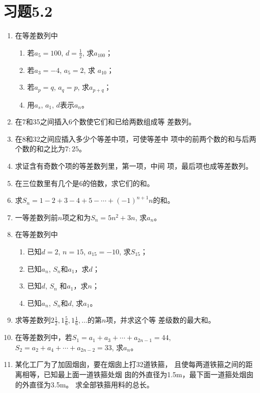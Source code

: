 \section*{习题5.2}
\begin{enumerate}
    \item 在等差数列中
\begin{multicols}{2}
\begin{enumerate}
    \item 若$a_5=100$, $d=\frac{1}{2}$,
    求$a_{100}$；
    \item 若$a_3=-4$, $a_5=2$, 求
    $a_{10}$；
    \item 若$a_p=q$, $a_q=p$, 求$a_{p+q}$；
    \item 用$a_s$, $a_1$, $d$表示$a_n$。
\end{enumerate}
\end{multicols}

\item 在7和35之间插入6个数使它们和已给两数组成等
差数列。
\item 在8和32之间应插入多少个等差中项，可使等差中
项中的前两个数的和与后两个数的和之比为$7:25$。
\item 求证含有奇数个项的等差数列里，第一项，中间
项，最后项也成等差数列。
\item 在三位数里有几个是6的倍数，求它们的和。
\item 求$S_n=1-2+3-4+5-\cdots+(-1)^{n+1}n$的和。
\item 一等差数列前$n$项之和为$S_n=5n^2+3n$, 求$a_n$。
\item 在等差数列中
\begin{enumerate}
    \item 已知$d=2$, $n=15$, $a_{15}=-10$, 求$S_{15}$；
    \item 已知$a_n$, $S_n$和$a_1$，求$d$；
    \item 已知$d$, $S_n$ 和$a_1$，求$n$；
    \item 已知$a_n$, $S_n$和$d$, 求$a_1$。
\end{enumerate}

\item 求等差数列$2\frac{1}{2},1\frac{5}{6},1\frac{1}{6},\ldots$的第$n$项，并求这个等
差级数的最大和。
\item 在等差数列中，若$S_1=a_1+a_3+\cdots+a_{2n-1}=44$,
$S_2=a_2+a_4+\cdots+a_{2n-2}=33$, 求$a_n$。
\item 某化工厂为了加固烟囱，要在烟囱上打32道铁箍，
且使每两道铁箍之间的距离相等，已知最上面一道铁箍处烟
囱的外直径为1.5m，最下面一道箍处烟囱的外直径为3.5m。
求全部铁箍用料的总长。


\end{enumerate}
